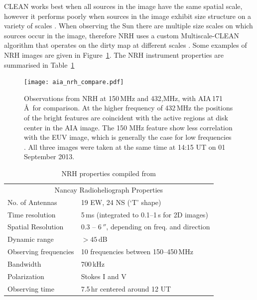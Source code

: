 CLEAN works best when all sources in the image have the same spatial scale, however it performs poorly when sources in the image exhibit size structure on a variety of scales \citep{wakker1998}. When observing the Sun there are multiple size scales on which sources occur in the image, therefore NRH uses a custom Multiscale-CLEAN algorithm that operates on the dirty map at different scales \citep{mercier2006}. Some examples of NRH images are given in Figure~\ref{fig:nrh_obs}. The NRH instrument properties are summarised in Table~\ref{tab:nrh}


\begin{figure}[!t]
\begin{center}
\texttt{[image: aia\_nrh\_compare.pdf]}
\caption[NRH observations]{Observations from NRH at 150\,MHz and 432,MHz, with AIA\,171\,\AA~for comparison. {\color{blue}At the higher frequency of 432\,MHz the positions of the bright features are coincident with the active regions at disk center in the AIA image. The 150 MHz feature show less correlation with the EUV image, which is generally the case for low frequencies \citep{mercier2009}.} All three images were taken at the same time at 14:15 UT on 01 September 2013.}
\label{fig:nrh_obs}
\end{center}
\end{figure}
\begin{table}[!t]
  \centering
\begin{tabular}{ll}
\hline
\multicolumn{2}{c}{Nancay Radioheliograph Properties} \\
\cline{1-2}
No. of Antennas		 & 19 EW, 24 NS (`T' shape) \\
Time resolution            & 5\,ms (integrated to 0.1--1\,s for 2D images) \\
Spatial Resolution        & 0.3 -- 6\,$''$, depending on freq. and direction \\
Dynamic range   		  & $>45$\,dB \\
Observing frequencies & 10 frequencies between 150--450\,MHz \\
Bandwidth                    & 700\,kHz \\
Polarization                  & Stokes I and V \\
Observing time             & 7.5\,hr centered around 12 UT \\
\hline

\end{tabular}
\caption {NRH properties compiled from \citep{kerdraon1997}}
\label{tab:nrh}
\end{table}

